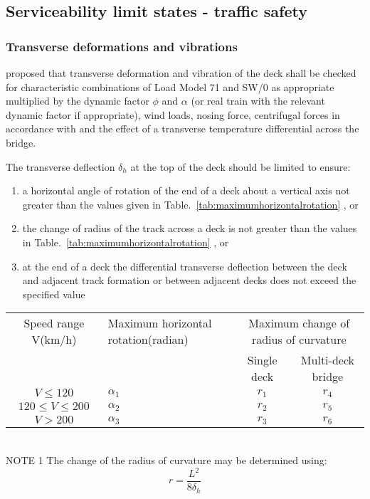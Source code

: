 \begin{appendices}
\subsection{Serviceability limit states - traffic safety}


\subsubsection{Transverse deformations and vibrations}\label{sec:Transverse-deformations-and-vibrations}
\citet[A2.4.4.2.4]{1990a2}  proposed that transverse deformation and vibration of the deck shall be checked for characteristic combinations of Load Model 71 and SW/0 as appropriate multiplied by the dynamic factor $\phi$ and $\alpha$ (or real train with the relevant dynamic factor if appropriate), wind loads, nosing force, centrifugal forces in accordance with \citet[6]{EC12} and the effect of a transverse temperature differential across the bridge.

The transverse deflection $ \delta_h $ at the top of the deck should be limited to ensure:

\begin{enumerate}
	\item a horizontal angle of rotation of the end of a deck about a vertical axis not greater than the values given in Table.~\ref{tab:maximumhorizontalrotation} , or
	\item the change of radius of the track across a deck is not greater than the values in Table.~\ref{tab:maximumhorizontalrotation} , or
	\item at the end of a deck the differential transverse deflection between the deck and adjacent track formation or between adjacent decks does not exceed the specified value
\end{enumerate}

\begin{table}[h]
	\centering
	\begin{tabularx}{0.8\textwidth}{cXcc}
	\hline
	Speed range V(km/h) & Maximum horizontal rotation(radian) & \multicolumn{2}{c}{Maximum change of radius of curvature}\\
	& & Single deck & Multi-deck bridge\\
	\hline
	$ V\leq 120 $ & $ \alpha_1 $ & $ r_1 $ & $ r_4 $ \\
	$ 120\leq V \leq 200 $ & $\alpha_2 $ & $r_2$ & $ r_5 $ \\
	$V>200$ & $ \alpha_3 $ & $r_3$ & $r_6$\\
	\hline
	\end{tabularx}
	\\
	NOTE 1 The change of the radius of curvature may be determined using:
			$$ r = \frac{L^2}{8 \delta_h}$$
			

\end{table}
\end{appendices}
